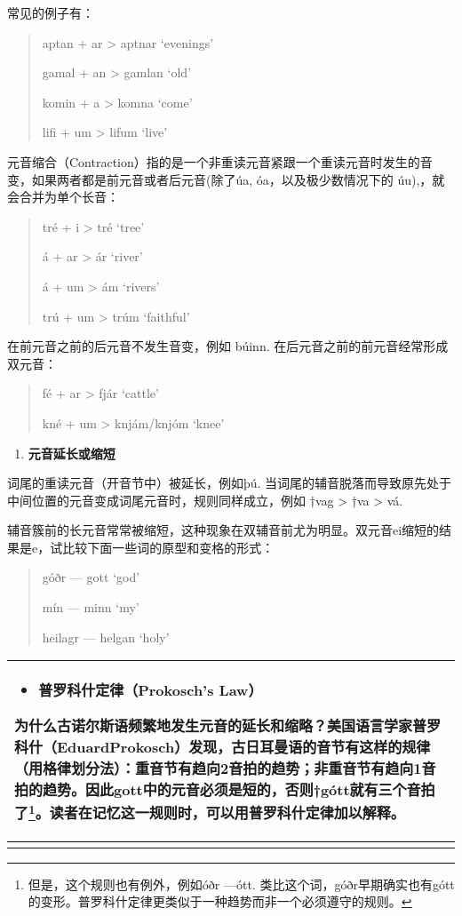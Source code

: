 常见的例子有：

\begin{quote}
aptan + ar \textgreater{} aptnar `evenings'

gamal + an \textgreater{} gamlan `old'

komin + a \textgreater{} komna `come'

lifi + um \textgreater{} lifum `live'
\end{quote}

元音缩合（Contraction）指的是一个非重读元音紧跟一个重读元音时发生的音变，如果两者都是前元音或者后元音(除了úa,
óa，以及极少数情况下的 úu),，就会合并为单个长音：

\begin{quote}
tré + i \textgreater{} tré `tree'

á + ar \textgreater{} ár `river'

á + um \textgreater{} ám `rivers'

trú + um \textgreater{} trúm `faithful'
\end{quote}

在前元音之前的后元音不发生音变，例如 búinn.
在后元音之前的前元音经常形成双元音：

\begin{quote}
fé + ar \textgreater{} fjár `cattle'

kné + um \textgreater{} knjám/knjóm `knee'
\end{quote}

\begin{enumerate}
\def\labelenumi{\Alph{enumi}.}
\setcounter{enumi}{2}
\item
  \textbf{元音延长或缩短}
\end{enumerate}

词尾的重读元音（开音节中）被延长，例如þú.
当词尾的辅音脱落而导致原先处于中间位置的元音变成词尾元音时，规则同样成立，例如
†vag \textgreater{} †va \textgreater{} vá.

辅音簇前的长元音常常被缩短，这种现象在双辅音前尤为明显。双元音ei缩短的结果是e，试比较下面一些词的原型和变格的形式：

\begin{quote}
góðr --- gott `god'

mín --- minn `my'

heilagr --- helgan `holy'
\end{quote}

\begin{longtable}{l}
\toprule
\begin{itemize}\item  \textbf{普罗科什定律（Prokosch's Law）}\end{itemize}为什么古诺尔斯语频繁地发生元音的延长和缩略？美国语言学家普罗科什（EduardProkosch）发现，古日耳曼语的音节有这样的规律（用格律划分法）：\textbf{重音节有趋向2音拍的趋势；非重音节有趋向1音拍的趋势。}因此gott中的元音必须是短的，否则†gótt就有三个音拍了\footnote{但是，这个规则也有例外，例如óðr  ---ótt.  类比这个词，góðr早期确实也有gótt的变形。普罗科什定律更类似于一种趋势而非一个必须遵守的规则。}。读者在记忆这一规则时，可以用普罗科什定律加以解释。 \\
\midrule
\endhead
\bottomrule
\endfoot
\end{longtable}

